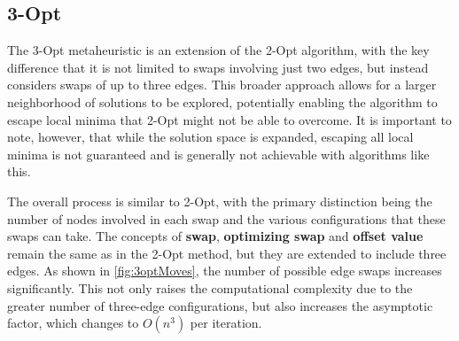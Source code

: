 

\subsection{3-Opt}

The 3-Opt metaheuristic is an extension of the 2-Opt algorithm, with the key difference that it is not limited to swaps involving just two edges, but instead considers swaps of up to three edges.
This broader approach allows for a larger neighborhood of solutions to be explored, potentially enabling the algorithm to escape local minima that 2-Opt might not be able to overcome.
It is important to note, however, that while the solution space is expanded, escaping all local minima is not guaranteed and is generally not achievable with algorithms like this.

The overall process is similar to 2-Opt, with the primary distinction being the number of nodes involved in each swap and the various configurations that these swaps can take.
The concepts of \textbf{swap}, \textbf{optimizing swap} and \textbf{offset value} remain the same as in the 2-Opt method, but they are extended to include three edges.
As shown in \figurename{ \ref{fig:3optMoves}}, the number of possible edge swaps increases significantly.
This not only raises the computational complexity due to the greater number of three-edge configurations, but also increases the asymptotic factor, which changes to $O(n^3)$ per iteration.


